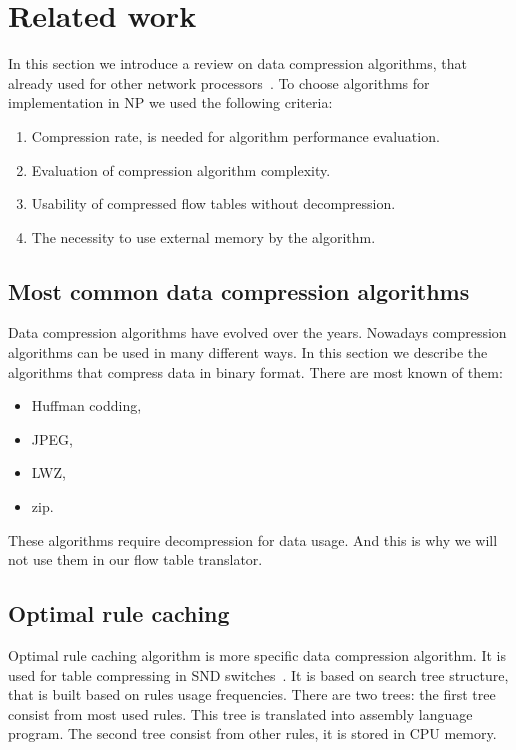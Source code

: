 \documentclass[conference]{IEEEtran}
\begin{document}
    \section{Related work}
        In this section we  introduce a review on data compression algorithms, that already used
        for other network processors~\cite{braun2014wildcard}. 
        To choose algorithms for implementation in NP we used the following criteria:
        \begin{enumerate}
            \item Compression rate, is needed for algorithm performance evaluation.
            \item Evaluation of compression algorithm complexity.
            \item Usability of compressed flow tables without decompression.
            \item The necessity to use external memory by the algorithm.
        \end{enumerate}

        \subsection{Most common data compression algorithms}
            Data compression algorithms have evolved over the years. Nowadays compression 
            algorithms can be used in many different ways. In this section we describe
            the algorithms that compress data in binary format.
            There are most known of them:
            
            \begin{itemize}
                \item Huffman codding,
                \item JPEG,
                \item LWZ,
                \item zip.
            \end{itemize}
  
            These algorithms require decompression for data usage. And this is why
            we will not use them in our flow table translator.
        
        \subsection{Optimal rule caching}
            Optimal rule caching algorithm is more specific data compression algorithm. 
            It is used for table compressing in SND switches~\cite{rottenstreich2016optimal}.
            It is based on search tree structure, that is built based on rules usage frequencies.
            There are two trees: the first tree consist from most used rules. This tree is translated into assembly
            language program. The second tree consist from other rules, it is stored in CPU memory.
        
\end{document}

